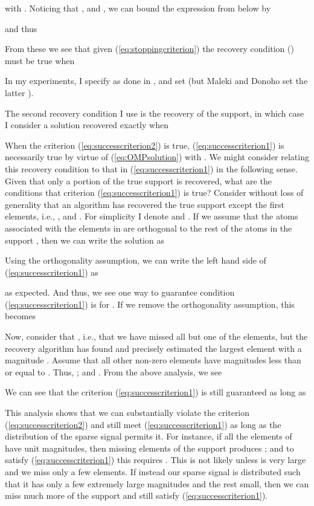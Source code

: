 \documentclass[11pt,draftcls,onecolumn]{IEEEtran}
\begin{document}
with .
Noticing that ,
and ,
we can bound the expression from below by

and thus

From these we see that given (\ref{eq:stoppingcriterion})
the recovery condition () must be true when

In my experiments, I specify  as done in \cite{Maleki2010}, 
and set  (but Maleki and Donoho set the latter ).

The second recovery condition I use is the recovery of the support,
in which case I consider a solution recovered exactly when 

When the criterion (\ref{eq:successcriterion2}) is true,
(\ref{eq:successcriterion1}) is necessarily true by virtue of (\ref{eq:OMPsolution})
with .
We might consider relating this recovery condition
to that in (\ref{eq:successcriterion1}) in the following sense.
Given that only a portion of the true support is recovered,
what are the conditions that criterion (\ref{eq:successcriterion1}) is true?
Consider without loss of generality
that an algorithm has recovered 
the true support except the first  elements, 
i.e., ,
and .
For simplicity I denote 
and .
If we assume that the atoms associated with the elements in 
are orthogonal to the rest of the atoms in the support ,
then we can write the solution as

Using the orthogonality assumption,
we can write the left hand side of (\ref{eq:successcriterion1}) as

as expected.
And thus, we see one way to guarantee condition (\ref{eq:successcriterion1}) is for
.
If we remove the orthogonality assumption, this becomes 


Now, consider that ,
i.e., that we have missed all but one of the elements,
but the recovery algorithm has found and precisely estimated 
the largest element with a magnitude .
Assume that all other non-zero elements have magnitudes 
less than or equal to .
Thus, ;
and .
From the above analysis, we see

We can see that the criterion (\ref{eq:successcriterion1}) is still guaranteed as long as


This analysis shows that we can substantially violate the criterion (\ref{eq:successcriterion2})
and still meet (\ref{eq:successcriterion1}) as long as the distribution of the sparse signal permits it.
For instance, if all the elements of  have unit magnitudes, 
then missing  elements of the support produces
;
and to satisfy (\ref{eq:successcriterion1}) this 
requires .
This is not likely unless  is very large and we miss only a few elements.
If instead our sparse signal is distributed such that it has
only a few extremely large magnitudes and the rest small,
then we can miss much more of the support and still satisfy (\ref{eq:successcriterion1}).
\end{document}
